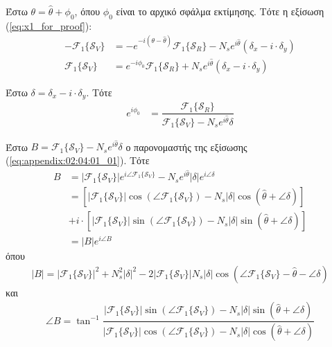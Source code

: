 Έστω $\theta = \hat{\theta} + \phi_0$, όπου $\phi_0$ είναι το αρχικό σφάλμα
εκτίμησης. Τότε η εξίσωση (\ref{eq:x1_for_proof}):
\begin{align}
  -\mathcal{F}_1\{\mathcal{S}_V\} &= -e^{-i(\theta-\hat{\theta})} \mathcal{F}_1\{\mathcal{S}_R\}- N_s e^{i\hat{\theta}}(\delta_x - i\cdot \delta_y) \nonumber\\
  \mathcal{F}_1\{\mathcal{S}_V\} &= e^{-i\phi_0} \mathcal{F}_1\{\mathcal{S}_R\}+ N_s e^{i\hat{\theta}}(\delta_x - i\cdot \delta_y) \nonumber
\end{align}

Έστω $\delta = \delta_x - i \cdot \delta_y$. Τότε
\begin{align}
  e^{i\phi_0} &= \dfrac{\mathcal{F}_1\{\mathcal{S}_R\}}{\mathcal{F}_1\{\mathcal{S}_V\} - N_s e^{i\hat{\theta}}\delta}  \label{eq:appendix:02:04:01_01}
\end{align}

Έστω $B = \mathcal{F}_1\{\mathcal{S}_V\} - N_s e^{i\hat{\theta}}\delta$ ο
παρονομαστής της εξίσωσης (\ref{eq:appendix:02:04:01_01}). Τότε
\begin{align}
  B &= |\mathcal{F}_1\{\mathcal{S}_V\}| e^{i\angle \mathcal{F}_1\{\mathcal{S}_V\}} - N_s e^{i\hat{\theta}}|\delta| e^{i \angle \delta} \nonumber \\
    &= [ |\mathcal{F}_1\{\mathcal{S}_V\}| \cos(\angle \mathcal{F}_1\{\mathcal{S}_V\}) - N_s |\delta| \cos(\hat{\theta} + \angle\delta) ] \nonumber \\
    &+ i\cdot [ |\mathcal{F}_1\{\mathcal{S}_V\}| \sin(\angle \mathcal{F}_1\{\mathcal{S}_V\}) - N_s |\delta| \sin(\hat{\theta} + \angle\delta) ] \nonumber \\
    &= |B| e^{i \angle B}
\end{align}
όπου
\begin{align}
  |B| = |\mathcal{F}_1\{\mathcal{S}_V\}|^2 + N_s^2|\delta|^2 -2 |\mathcal{F}_1\{\mathcal{S}_V\}| N_s |\delta| \cos(\angle \mathcal{F}_1\{\mathcal{S}_V\}-\hat{\theta} - \angle\delta) \nonumber
\end{align}
και
\begin{align}
  \angle B = \tan^{-1} \dfrac{ |\mathcal{F}_1\{\mathcal{S}_V\}| \sin(\angle \mathcal{F}_1\{\mathcal{S}_V\}) - N_s |\delta| \sin(\hat{\theta} + \angle\delta)}{|\mathcal{F}_1\{\mathcal{S}_V\}| \cos(\angle \mathcal{F}_1\{\mathcal{S}_V\}) - N_s |\delta| \cos(\hat{\theta} + \angle\delta)} \label{eq:appendix:02:04:01_02}
\end{align}

